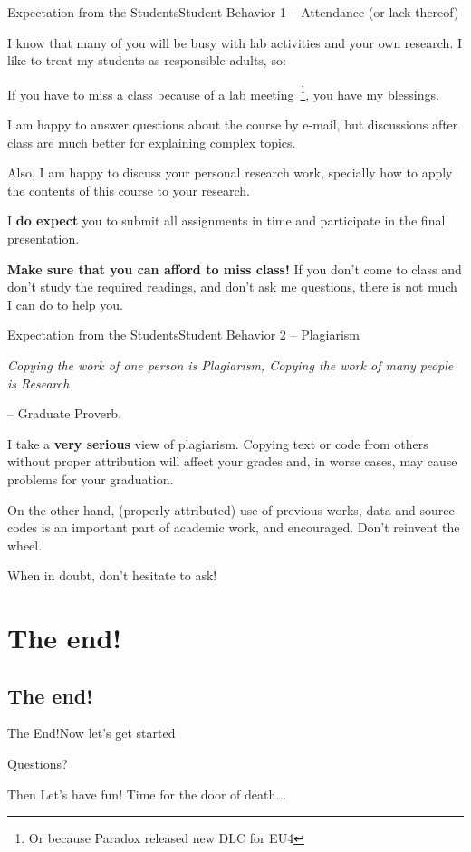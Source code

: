 \documentclass[t]{beamer}
\begin{document}
\begin{ftst}
  {Expectation from the Students}{Student Behavior 1 -- Attendance (or lack thereof)}

  I know that many of you will be busy with lab activities and your
  own research. I like to treat my students as responsible adults, so:

  {\small

   If you have to
  miss a class because of a lab meeting~\footnote{Or because Paradox
    released new DLC for EU4}, you have my blessings.
\item I am happy to answer questions about the course by e-mail, but
  discussions after class are much better for explaining complex
  topics.
\item Also, I am happy to discuss your personal research work,
  specially how to apply the contents of this course to your research.
\item I {\bf do expect} you to submit all assignments in time and
  participate in the final presentation.\eitem }
  
{\bf Make sure that you can afford to miss class!} If you don't come
to class and don't study the required readings, and don't ask me
questions, there is not much I can do to help you.

\end{ftst}

\begin{ftst}
  {Expectation from the Students}{Student Behavior 2 -- Plagiarism}

  \begin{center}
    \emph{Copying the work of one person is Plagiarism, Copying the work of many people is Research}
  \end{center}
  \hfill -- Graduate Proverb.

  \vone

  I take a {\bf very serious} view of plagiarism. Copying text or code
  from others without proper attribution will affect your grades and,
  in worse cases, may cause problems for your graduation.

  \vone

  On the other hand, (properly attributed) use of previous works, data
  and source codes is an important part of academic work, and
  encouraged. Don't reinvent the wheel.

  \vone

  \alert{When in doubt, don't hesitate to ask!}

\end{ftst}

\section{The end!}
\subsection{The end!}

\begin{ftst}
  {The End!}{Now let's get started}

  \begin{center}
    Questions?

    \vone

    Then Let's have fun! Time for the \alert{door of death...}
  \end{center}
\end{ftst}
\end{document}
